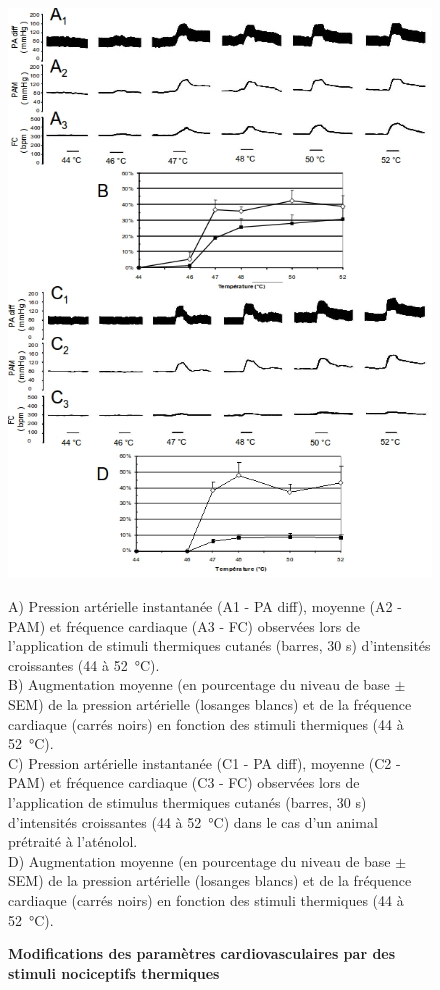 \documentclass[a4paper,12pt,twoside]{report}
\begin{document}
\begin{figure}[p]

\begin{center}
 \includegraphics[width=14.5cm]{Figure11.jpg} 
\end{center}

\caption{\textbf{Modifications des paramètres cardiovasculaires par des stimuli nociceptifs thermiques}}

{\protect\parbox[t]{18cm}{
\begin{small}
A) Pression artérielle instantanée (A1 - PA diff), moyenne (A2 - PAM) et fréquence cardiaque (A3 - FC) observées lors de l'application de stimuli thermiques cutanés (barres, 30 s) d’intensités croissantes (44 à 52~°C).\\
B) Augmentation moyenne (en pourcentage du niveau de base $\pm$ SEM) de la pression artérielle (losanges blancs) et de la fréquence cardiaque (carrés noirs) en fonction des stimuli thermiques (44 à 52~°C). \\
C) Pression artérielle instantanée (C1 - PA diff), moyenne (C2 - PAM) et fréquence cardiaque (C3 - FC) observées lors de l'application de stimulus thermiques cutanés (barres, 30 s) d’intensités croissantes (44 à 52~°C) dans le cas d'un animal prétraité à l’aténolol.\\
D) Augmentation moyenne (en pourcentage du niveau de base $\pm$ SEM) de la pression artérielle (losanges blancs) et de la fréquence cardiaque (carrés noirs) en fonction des stimuli thermiques (44 à 52~°C).
\end{small}}}


\end{figure}
\end{document}
